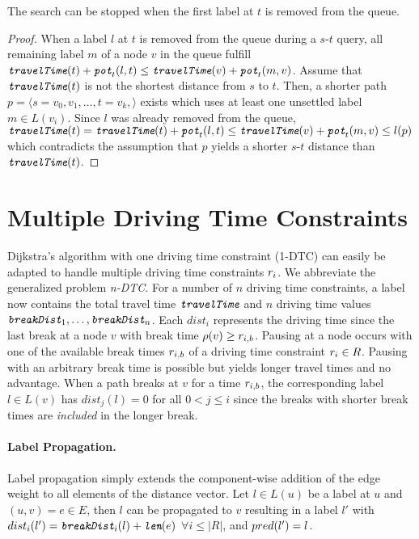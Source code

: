 \begin{theorem}\label{theorem:pot_stop_criterion}
	The search can be stopped when the first label at $t$ is removed from the queue.
\end{theorem}

\begin{proof}
	When a label $l$ at $t$ is removed from the queue during a $s$-$t$ query, all remaining label $m$ of a node $v$ in the queue fulfill $\texttt{\itshape travelTime}(t) + \texttt{\itshape pot}_t(l,t) \le \texttt{\itshape travelTime}(v) + \texttt{\itshape pot}_t(m,v)$. Assume that $\texttt{\itshape travelTime}(t)$ is not the shortest distance from $s$ to $t$. Then, a shorter path $p = \langle s=v_0,v_1,\ldots,t=v_k, \rangle$ exists which uses at least one unsettled label $m \in L(v_i)$. Since $l$ was already removed from the queue, $\texttt{\itshape travelTime}(t) = \texttt{\itshape travelTime}(t) + \texttt{\itshape pot}_t(l,t) \le  \texttt{\itshape travelTime}(v) + \texttt{\itshape pot}_t(m,v) \le l(p)$ which contradicts the assumption that $p$ yields a shorter $s$-$t$ distance than $\texttt{\itshape travelTime}(t)$.
\end{proof}

\section{Multiple Driving Time Constraints}
Dijkstra's algorithm with one driving time constraint (1-DTC) can easily be adapted to handle multiple driving time constraints $r_i$. We abbreviate the generalized problem \emph{n-DTC}. For a number of $n$ driving time constraints, a label now contains the total travel time $\texttt{\itshape travelTime}$ and $n$ driving time values $\texttt{\itshape breakDist}_1, \ldots , \texttt{\itshape breakDist}_n$. Each $dist_i$ represents the driving time since the last break at a node $v$ with break time $\rho(v) \ge r_{i,b}$. Pausing at a node occurs with one of the available break times $r_{i,b}$ of a driving time constraint $r_i \in R$. Pausing with an arbitrary break time is possible but yields longer travel times and no advantage. When a path breaks at $v$ for a time $r_{i,b}$, the corresponding label $l \in L(v)$ has $dist_j(l) = 0$ for all $0 < j \le i$ since the breaks with shorter break times are \emph{included} in the longer break.

\paragraph{Label Propagation.}
Label propagation simply extends the component-wise addition of the edge weight to all elements of the distance vector. Let $l \in L(u)$ be a label at $u$ and $(u,v) = e \in E$, then $l$ can be propagated to $v$ resulting in a label $l'$ with $dist_i(l') = \texttt{\itshape breakDist}_i(l) + \texttt{\itshape len}(e)$ $\forall i \le |R|$, and $pred(l') = l$.

